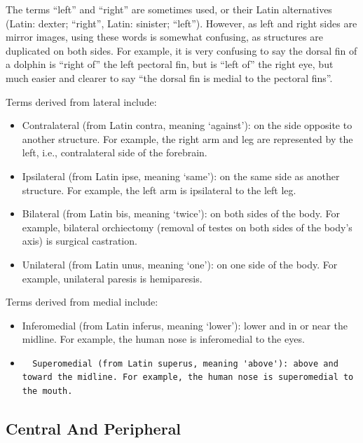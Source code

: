 The terms ``left'' and ``right'' are sometimes used, or their Latin alternatives (Latin: dexter; ``right'', Latin: sinister; ``left''). However, as left and right sides are mirror images, using these words is somewhat confusing, as structures are duplicated on both sides. For example, it is very confusing to say the dorsal fin of a dolphin is ``right of'' the left pectoral fin, but is ``left of'' the right eye, but much easier and clearer to say ``the dorsal fin is medial to the pectoral fins''.

Terms derived from lateral include:

\begin{itemize}
\tightlist
\item
  Contralateral (from Latin contra, meaning `against'): on the side opposite to another structure. For example, the right arm and leg are represented by the left, i.e., contralateral side of the forebrain.
\item
  Ipsilateral (from Latin ipse, meaning `same'): on the same side as another structure. For example, the left arm is ipsilateral to the left leg.
\item
  Bilateral (from Latin bis, meaning `twice'): on both sides of the body. For example, bilateral orchiectomy (removal of testes on both sides of the body's axis) is surgical castration.
\item
  Unilateral (from Latin unus, meaning `one'): on one side of the body. For example, unilateral paresis is hemiparesis.
\end{itemize}

Terms derived from medial include:

\begin{itemize}
\item
  Inferomedial (from Latin inferus, meaning `lower'): lower and in or near the midline. For example, the human nose is inferomedial to the eyes.
\item
\begin{verbatim}
  Superomedial (from Latin superus, meaning 'above'): above and toward the midline. For example, the human nose is superomedial to the mouth.
\end{verbatim}
\end{itemize}

\hypertarget{central-and-peripheral}{%
\subsection{Central And Peripheral}\label{central-and-peripheral}}

